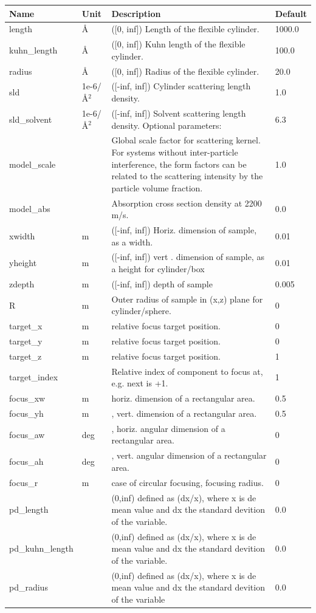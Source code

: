 \begin{longtable}{p{}p{}p{}p{}}
\toprule
\textbf{Name} & \textbf{Unit} & \textbf{Description} & \textbf{Default} \\
\midrule
\endhead
length & \AA{} & ([0, inf]) Length of the flexible cylinder. & 1000.0 \\
kuhn\_length & \AA{} & ([0, inf]) Kuhn length of the flexible cylinder. & 100.0 \\
radius & \AA{} & ([0, inf]) Radius of the flexible cylinder. & 20.0 \\
sld & 1e-6/\AA{}$^{2}$ & ([-inf, inf]) Cylinder scattering length density. & 1.0 \\
sld\_solvent & 1e-6/\AA{}$^{2}$ & ([-inf, inf]) Solvent scattering length density. Optional parameters: & 6.3 \\
model\_scale &   & Global scale factor for scattering kernel. For systems without inter-particle interference, the form factors can be related to the scattering intensity by the particle volume fraction. & 1.0 \\
model\_abs &   & Absorption cross section density at 2200 m/s. & 0.0 \\
xwidth & m & ([-inf, inf]) Horiz. dimension of sample, as a width. & 0.01 \\
yheight & m & ([-inf, inf]) vert . dimension of sample, as a height for cylinder/box & 0.01 \\
zdepth & m & ([-inf, inf]) depth of sample & 0.005 \\
R & m & Outer radius of sample in (x,z) plane for cylinder/sphere. & 0 \\
target\_x & m & relative focus target position. & 0 \\
target\_y & m & relative focus target position. & 0 \\
target\_z & m & relative focus target position. & 1 \\
target\_index &   & Relative index of component to focus at, e.g. next is +1. & 1 \\
focus\_xw & m & horiz. dimension of a rectangular area. & 0.5 \\
focus\_yh & m & , vert. dimension of a rectangular area. & 0.5 \\
focus\_aw & deg & , horiz. angular dimension of a rectangular area. & 0 \\
focus\_ah & deg & , vert. angular dimension of a rectangular area. & 0 \\
focus\_r & m & case of circular focusing, focusing radius. & 0 \\
pd\_length &  & (0,inf) defined as (dx/x), where x is de mean value and dx the standard devition of the variable. & 0.0 \\
pd\_kuhn\_length &  & (0,inf) defined as (dx/x), where x is de mean value and dx the standard devition of the variable. & 0.0 \\
pd\_radius &  & (0,inf) defined as (dx/x), where x is de mean value and dx the standard devition of the variable & 0.0 \\
\bottomrule
\end{longtable}

